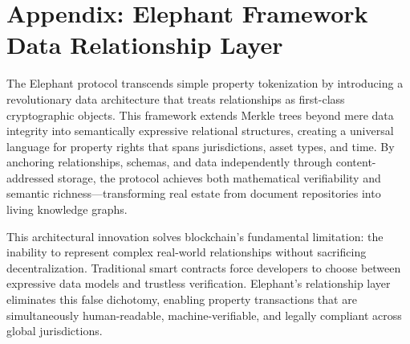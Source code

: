 \chapter{Appendix: Elephant Framework Data Relationship Layer}

The Elephant protocol transcends simple property tokenization by introducing a revolutionary data architecture that treats relationships as first-class cryptographic objects. This framework extends Merkle trees beyond mere data integrity into semantically expressive relational structures, creating a universal language for property rights that spans jurisdictions, asset types, and time. By anchoring relationships, schemas, and data independently through content-addressed storage, the protocol achieves both mathematical verifiability and semantic richness—transforming real estate from document repositories into living knowledge graphs.

This architectural innovation solves blockchain's fundamental limitation: the inability to represent complex real-world relationships without sacrificing decentralization. Traditional smart contracts force developers to choose between expressive data models and trustless verification. Elephant's relationship layer eliminates this false dichotomy, enabling property transactions that are simultaneously human-readable, machine-verifiable, and legally compliant across global jurisdictions.

